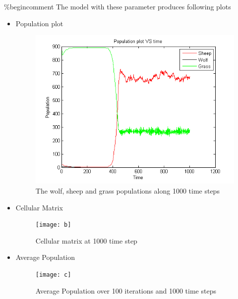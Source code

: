 \documentclass[prl,12pt,citeautoscript,reprint]{revtex4-1}
\begin{document}
\%begin{comment} 
The model with these parameter produces following plots
\begin{itemize}
\item Population plot
\begin{figure}[H]
\centering
\includegraphics[width = 0.8\columnwidth]{a} 

\caption{The wolf, sheep and grass populations along 1000 time steps}\label{Fig:Population vs time}
\end{figure}
\item Cellular Matrix 
\begin{figure}[H]
\centering
\texttt{[image: b]} 
 
\caption{Cellular matrix at 1000 time step}\label{Fig:Cellular matrix at 1000 time step}
\end{figure}

\item Average Population 
\begin{figure}[H]
\centering
\texttt{[image: c]} 
 
\caption{Average Population over 100 iterations and 1000 time steps}\label{Fig:Cellular matrix at 1000 time step}
\end{figure}

\end{itemize}
 
\end{document}
